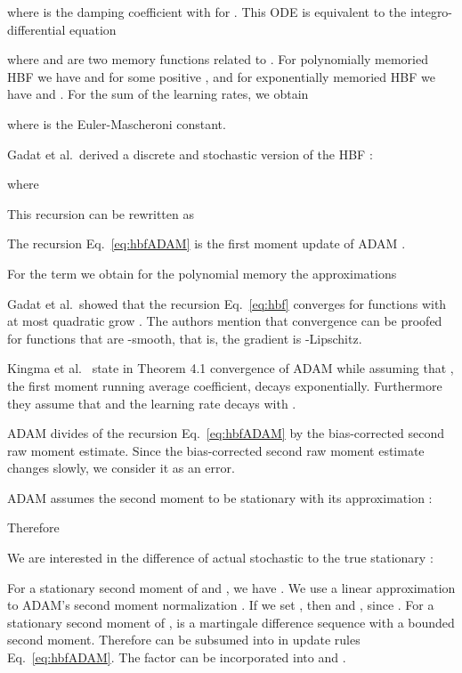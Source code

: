 \documentclass{article}
\begin{document}
where  is the damping coefficient with
 for .
This ODE is equivalent to the integro-differential equation

where  and  are two memory functions related to .
For polynomially memoried HBF we have  and  for some positive
, and for exponentially
memoried HBF we have  and
.
For the sum of the learning rates, we obtain

where  is the Euler-Mascheroni constant.


Gadat et al.\ derived a discrete and stochastic version of the HBF \cite{Gadat:16}:

where



This recursion can be rewritten as

The recursion Eq.~\eqref{eq:hbfADAM} is the first moment update of ADAM \cite{Kingma:14}.

For the term  we obtain for the polynomial memory the approximations




Gadat et al.\ showed that the recursion
Eq.~\eqref{eq:hbf} converges
for functions with at most quadratic grow \cite{Gadat:16}.
The authors mention that convergence can be proofed
for functions  that are -smooth, that is, the gradient is -Lipschitz.


Kingma et al.\ \cite{Kingma:14} state in Theorem 4.1
convergence of ADAM while assuming that , the
first moment running average coefficient, decays exponentially.
Furthermore they assume that 
and the learning rate  decays with
.

ADAM divides  of the recursion Eq.~\eqref{eq:hbfADAM}
by the bias-corrected second raw moment estimate.
Since the bias-corrected second raw moment estimate changes slowly,
we consider it as an error.




ADAM assumes the second moment
 to be stationary with its  approximation
:






Therefore



We are interested in the difference of actual stochastic  to the
true stationary :


For a stationary second moment of  and , we have
.
We use a linear approximation to ADAM's second moment normalization
.
If we set , then  and
, since .
For a stationary second moment of ,  is a martingale
difference sequence with a bounded second moment.
Therefore  can be subsumed into   in update
rules Eq.~\eqref{eq:hbfADAM}. The factor  can be
incorporated into  and .
\end{document}
